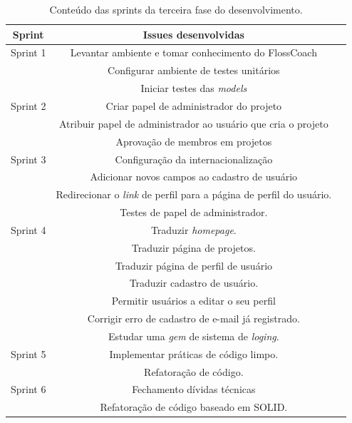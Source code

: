 \begin{table}[h]
	\centering
	\begin{tabular}{ccc}
		\toprule
		\textbf{Sprint} & \textbf{Issues desenvolvidas} \\
		\midrule
		Sprint 1 & Levantar ambiente e tomar conhecimento do FlossCoach \\
			 & Configurar ambiente de testes unitários \\
			 & Iniciar testes das \textit{models}\\
		\midrule
		Sprint 2 & Criar papel de administrador do projeto\\
			 & Atribuir papel de administrador ao usuário que cria o projeto \\
			 & Aprovação de membros em projetos \\
		\midrule		
		Sprint 3 & Configuração da internacionalização \\
			 & Adicionar novos campos ao cadastro de usuário\\
			 & Redirecionar o \textit{link} de perfil para a página de perfil do usuário.\\
			 & Testes de papel de administrador.\\
		\midrule		
		Sprint 4 & Traduzir \textit{homepage}.\\
			 & Traduzir página de projetos.\\
			 & Traduzir página de perfil de usuário\\
			 & Traduzir cadastro de usuário.\\ 
			 & Permitir usuários a editar o seu perfil\\
			 & Corrigir erro de cadastro de e-mail já registrado.\\
			 & Estudar uma \textit{gem} de sistema de \textit{loging}.\\  
		\midrule		
		Sprint 5 & Implementar práticas de código limpo.\\
			 & Refatoração de código.\\
	
		\midrule
		Sprint 6 & Fechamento dívidas técnicas\\
			 & Refatoração de código baseado em SOLID.\\
		\bottomrule
	\end{tabular}

	\caption{Conteúdo das sprints da terceira fase do desenvolvimento.}
	\label{issues}
\end{table}

